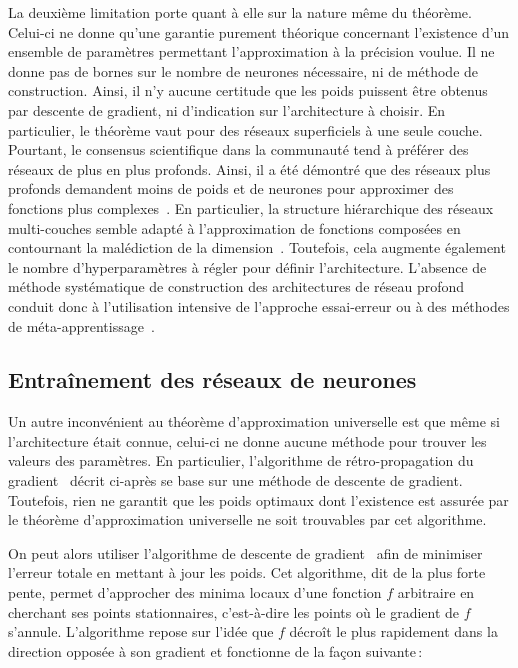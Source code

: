 La deuxième limitation porte quant à elle sur la nature même du théorème. Celui-ci ne donne qu'une garantie purement théorique concernant l'existence d'un ensemble de paramètres permettant l'approximation à la précision voulue. Il ne donne pas de bornes sur le nombre de neurones nécessaire, ni de méthode de construction. Ainsi, il n'y aucune certitude que les poids puissent être obtenus par descente de gradient, ni d'indication sur l'architecture à choisir. En particulier, le théorème vaut pour des réseaux superficiels à une seule couche. Pourtant, le consensus scientifique dans la communauté tend à préférer des réseaux de plus en plus profonds. Ainsi, il a été démontré que des réseaux plus profonds demandent moins de poids et de neurones pour approximer des fonctions plus complexes~\cite{bianchini_complexity_2014,mhaskar_when_2017}. En particulier, la structure hiérarchique des réseaux multi-couches semble adapté à l'approximation de fonctions composées en contournant la malédiction de la dimension~\cite{poggio_why_2017}. Toutefois, cela augmente également le nombre d'hyperparamètres à régler pour définir l'architecture. L'absence de méthode systématique de construction des architectures de réseau profond conduit donc à l'utilisation intensive de l'approche essai-erreur ou à des méthodes de méta-apprentissage~\cite{zoph_neural_2016}.

\subsection{Entraînement des réseaux de neurones}

Un autre inconvénient au théorème d'approximation universelle est que même si l'architecture était connue, celui-ci ne donne aucune méthode pour trouver les valeurs des paramètres. En particulier, l'algorithme de rétro-propagation du gradient~\cite{werbos_beyond_1975,rumelhart_learning_1986,lecun_learning_1986} décrit ci-après se base sur une méthode de descente de gradient. Toutefois, rien ne garantit que les poids optimaux dont l'existence est assurée par le théorème d'approximation universelle ne soit trouvables par cet algorithme.

On peut alors utiliser l'algorithme de descente de gradient~\cite{cauchy_comptes_1847} afin de minimiser l'erreur totale en mettant à jour les poids. Cet algorithme, dit de la plus forte pente, permet d'approcher des minima locaux d'une fonction $f$ arbitraire en cherchant ses points stationnaires, c'est-à-dire les points où le gradient de $f$ s'annule. L'algorithme repose sur l'idée que $f$ décroît le plus rapidement dans la direction opposée à son gradient et fonctionne de la façon suivante\,:

